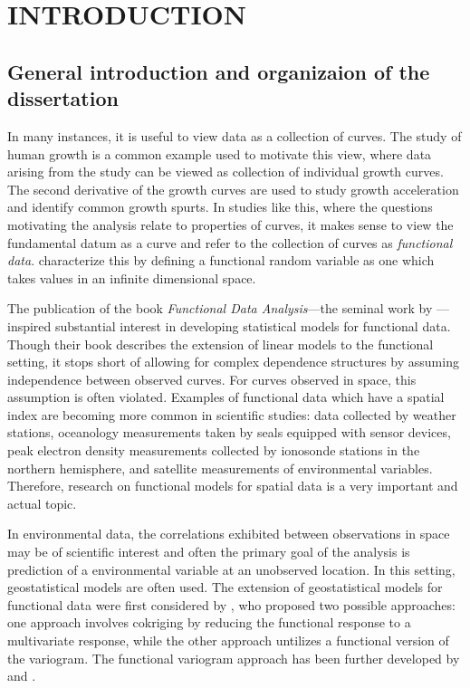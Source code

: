 
\chapter{INTRODUCTION}

\section{General introduction and organizaion of the dissertation}
In many instances, it is useful to view data as a collection of curves. The study of human growth is a common example used to motivate this view, where data arising from the study can be viewed as collection of individual growth curves.  The second derivative of the growth curves are used to study growth acceleration and identify common growth spurts. In studies like this, where the questions motivating the analysis relate to properties of curves, it makes sense to view the fundamental datum as a curve and refer to the collection of curves as \emph{functional data}.  \cite{ferraty2006nonparametric} characterize this by defining a functional random variable as one which takes values in an infinite dimensional space. 

The publication of the book \emph{Functional Data Analysis}---the seminal work by \cite{FDA}---inspired substantial interest in developing statistical models for functional data.  Though their book describes the extension of linear models to the functional setting, it stops short of allowing for complex dependence structures by assuming independence between observed curves. For curves observed in space, this assumption is often violated. Examples of functional data which have a spatial index are becoming more common in scientific studies: data collected by weather stations, oceanology measurements taken by seals equipped with sensor devices, peak electron density measurements collected by ionosonde stations in the northern hemisphere, and satellite measurements of environmental variables. Therefore,  research on functional models for spatial data is a very important and actual topic.

 In environmental data,  the correlations exhibited between observations in space may be of scientific interest and often the primary goal of the analysis is prediction of a environmental variable at an unobserved location.  In this setting, geostatistical models are often used. The extension of geostatistical models for functional data were first considered by \cite{Goulard:1993}, who proposed two possible approaches: one approach involves cokriging by reducing the functional response to a multivariate response, while the other approach untilizes a functional version of the variogram.  The functional variogram approach has been further developed by \cite{Giraldo:2010jx} and \cite{Nerini:2010ba}.

